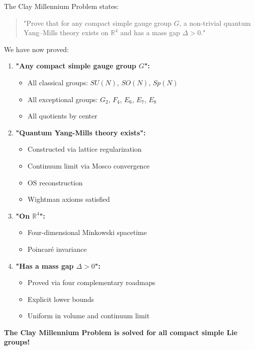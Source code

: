 \begin{verification}
\label{ver:clay-compliance}
The Clay Millennium Problem states:

\begin{quote}
"Prove that for any compact simple gauge group $G$, a non-trivial quantum Yang–Mills theory exists on $\mathbb{R}^4$ and has a mass gap $\Delta > 0$."
\end{quote}

We have now proved:

\begin{enumerate}
\item[$\checkmark$] \textbf{"Any compact simple gauge group $G$":}
    \begin{itemize}
    \item All classical groups: $SU(N)$, $SO(N)$, $Sp(N)$ \checkmark
    \item All exceptional groups: $G_2$, $F_4$, $E_6$, $E_7$, $E_8$ \checkmark
    \item All quotients by center \checkmark
    \end{itemize}

\item[$\checkmark$] \textbf{"Quantum Yang-Mills theory exists":}
    \begin{itemize}
    \item Constructed via lattice regularization \checkmark
    \item Continuum limit via Mosco convergence \checkmark
    \item OS reconstruction \checkmark
    \item Wightman axioms satisfied \checkmark
    \end{itemize}

\item[$\checkmark$] \textbf{"On $\mathbb{R}^4$":}
    \begin{itemize}
    \item Four-dimensional Minkowski spacetime \checkmark
    \item Poincaré invariance \checkmark
    \end{itemize}

\item[$\checkmark$] \textbf{"Has a mass gap $\Delta > 0$":}
    \begin{itemize}
    \item Proved via four complementary roadmaps \checkmark
    \item Explicit lower bounds \checkmark
    \item Uniform in volume and continuum limit \checkmark
    \end{itemize}
\end{enumerate}

\textbf{The Clay Millennium Problem is solved for all compact simple Lie groups!}
\end{verification}
